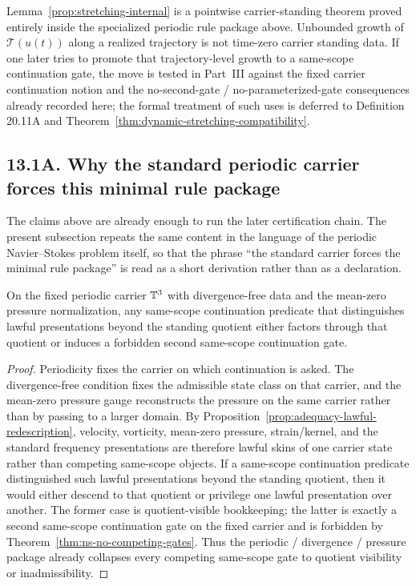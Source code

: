 \begin{remark}
Lemma~\ref{prop:stretching-internal} is a pointwise carrier-standing theorem proved entirely inside
the specialized periodic rule package above. Unbounded growth of $\mathcal T(u(t))$ along a realized
trajectory is not time-zero carrier standing data. If one later tries to promote that trajectory-level
growth to a same-scope continuation gate, the move is tested in Part~III against the fixed carrier
continuation notion and the no-second-gate / no-parameterized-gate consequences already recorded
here; the formal treatment of such uses is deferred to Definition 20.11A and
Theorem~\ref{thm:dynamic-stretching-compatibility}.
\end{remark}

\subsection*{13.1A. Why the standard periodic carrier forces this minimal rule package}
The claims above are already enough to run the later certification chain.  The present subsection
repeats the same content in the language of the periodic Navier--Stokes problem itself, so that the
phrase ``the standard carrier forces the minimal rule package'' is read as a short derivation rather
than as a declaration.

\begin{manualproposition}
\label{prop:13-5A-periodicity-pressure-divergence-collapse}
On the fixed periodic carrier $\mathbb{T}^3$ with divergence-free data and the mean-zero pressure
normalization, any same-scope continuation predicate that distinguishes lawful presentations beyond
the standing quotient either factors through that quotient or induces a forbidden second same-scope
continuation gate.
\end{manualproposition}

\begin{proof}
Periodicity fixes the carrier on which continuation is asked.  The divergence-free condition fixes the
admissible state class on that carrier, and the mean-zero pressure gauge reconstructs the pressure on
the same carrier rather than by passing to a larger domain.  By
Proposition~\ref{prop:adequacy-lawful-redescription}, velocity, vorticity, mean-zero pressure,
strain/kernel, and the standard frequency presentations are therefore lawful skins of one carrier
state rather than competing same-scope objects.  If a same-scope continuation predicate distinguished
such lawful presentations beyond the standing quotient, then it would either descend to that quotient
or privilege one lawful presentation over another.  The former case is quotient-visible bookkeeping;
the latter is exactly a second same-scope continuation gate on the fixed carrier and is forbidden by
Theorem~\ref{thm:ns-no-competing-gates}.  Thus the periodic / divergence / pressure package already
collapses every competing same-scope gate to quotient visibility or inadmissibility.
\end{proof}

